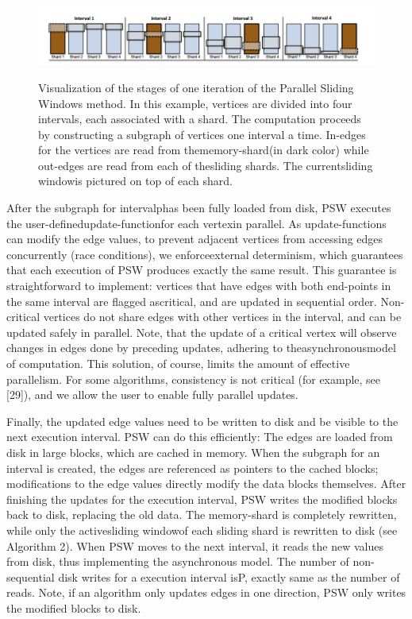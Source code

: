 \documentclass {article}
\begin{document}
\begin{figure}
  \centering
  \includegraphics[width=\textwidth]{PSW.png}\\
  \caption{Visualization of the stages of one iteration of the Parallel Sliding Windows method. In this example, vertices
are divided into four intervals, each associated with a shard. The computation proceeds by constructing a subgraph of
vertices one interval a time. In-edges for the vertices are read from thememory-shard(in dark color) while out-edges
are read from each of thesliding shards. The currentsliding windowis pictured on top of each shard.}\label{PSW}
\end{figure}



After the subgraph for intervalphas been fully loaded from
disk, PSW executes the user-definedupdate-functionfor
each vertexin parallel. As update-functions can modify the
edge values, to prevent adjacent vertices from accessing
edges concurrently (race conditions), we enforceexternal
determinism, which guarantees that each execution of PSW
produces exactly the same result. This guarantee is straightforward to implement: vertices that have edges with both
end-points in the same interval are flagged ascritical, and
are updated in sequential order. Non-critical vertices do
not share edges with other vertices in the interval, and
can be updated safely in parallel. Note, that the update of
a critical vertex will observe changes in edges done by
preceding updates, adhering to theasynchronousmodel of
computation. This solution, of course, limits the amount of
effective parallelism. For some algorithms, consistency is
not critical (for example, see [29]), and we allow the user
to enable fully parallel updates.

Finally, the updated edge values need to be written to disk
and be visible to the next execution interval. PSW can do
this efficiently: The edges are loaded from disk in large
blocks, which are cached in memory. When the subgraph
for an interval is created, the edges are referenced as pointers to the cached blocks; modifications to the edge values
directly modify the data blocks themselves. After finishing the updates for the execution interval, PSW writes the
modified blocks back to disk, replacing the old data. The
memory-shard is completely rewritten, while only the activesliding windowof each sliding shard is rewritten to
disk (see Algorithm 2). When PSW moves to the next interval, it reads the new values from disk, thus implementing
the asynchronous model. The number of non-sequential
disk writes for a execution interval isP, exactly same as the
number of reads. Note, if an algorithm only updates edges
in one direction, PSW only writes the modified blocks to
disk.
\end{document}
